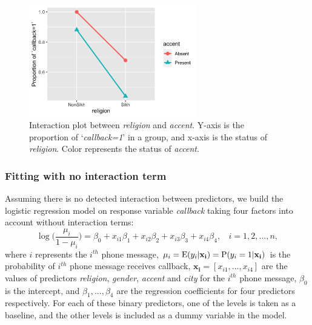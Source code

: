 \documentclass[11pt]{article}
\begin{document}
\begin{figure}[!h]
    \centering
    \includegraphics[width=0.65\textwidth]{../../Plots/Interaction_accent_religion.png}
    \caption{Interaction plot between \textit{religion} and \textit{accent}. Y-axis is the proportion of `\textit{callback=1}' in a group, and x-axis is the status of \textit{religion}. Color represents the status of \textit{accent}.}
    \label{fig:interact}
\end{figure}

\subsubsection{Fitting with no interaction term}
Assuming there is no detected interaction between predictors, we build the logistic regression model on response variable \textit{callback} taking four factors into account without interaction terms:
\begin{equation}
    \log \bigg(\frac{\mu_i}{1-\mu_i} \bigg) = \beta_0 + x_{i1}\beta_1 + x_{i2}\beta_2 + x_{i3}\beta_3 + x_{i4}\beta_4,\ \ \ \ i=1,2,...,n,
    \label{eq:logistic}
\end{equation}
where $i$ represents the $i^{th}$ phone message,  $\mu_i = \textnormal{E}(y_i|\mathbf{x_i}) = \textnormal{P}(y_i = 1|\mathbf{x_i})$ is the probability of $i^{th}$ phone message receives callback, $\mathbf{x_i} = [x_{i1},...,x_{i4}]$ are the values of predictors \textit{religion}, \textit{gender}, \textit{accent}  and \textit{city} for the $i^{th}$ phone message, $\beta_0$ is the intercept, and $\beta_1, ..., \beta_4$ are the regression coefficients for four predictors respectively. For  each of these binary predictors, one of the levels is taken as a baseline, and the other levels is included as a dummy variable in the model. 
\end{document}
